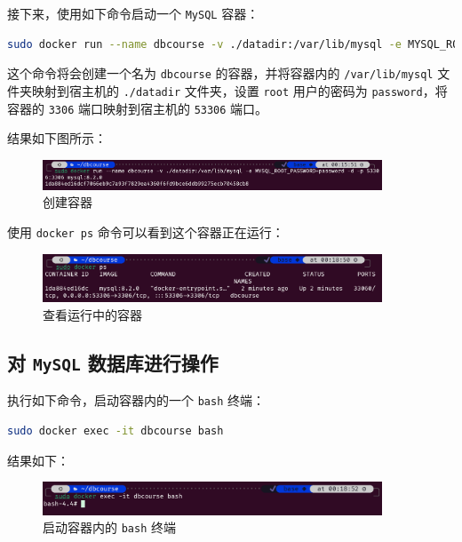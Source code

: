 \documentclass{article}
\begin{document}
接下来，使用如下命令启动一个 \texttt{MySQL} 容器：

\begin{lstlisting}[language=bash]
sudo docker run --name dbcourse -v ./datadir:/var/lib/mysql -e MYSQL_ROOT_PASSWORD=password -d -p 53306:3306 mysql:8.2.0
\end{lstlisting}

这个命令将会创建一个名为 \texttt{dbcourse} 的容器，并将容器内的 \texttt{/var/lib/mysql} 文件夹映射到宿主机的 \texttt{./datadir} 文件夹，设置 \texttt{root} 用户的密码为 \texttt{password}，将容器的 \texttt{3306} 端口映射到宿主机的 \texttt{53306} 端口。

结果如下图所示：

\begin{figure}[H]
  \centering
  \includegraphics[width=0.9\textwidth]{img/3.png}
  \caption{创建容器}
\end{figure}

使用 \texttt{docker ps} 命令可以看到这个容器正在运行：

\begin{figure}[H]
  \centering
  \includegraphics[width=0.9\textwidth]{img/4.png}
  \caption{查看运行中的容器}
\end{figure}

\subsection{对 \texttt{MySQL} 数据库进行操作}

执行如下命令，启动容器内的一个 \texttt{bash} 终端：

\begin{lstlisting}[language=bash]
sudo docker exec -it dbcourse bash
\end{lstlisting}

结果如下：

\begin{figure}[H]
  \centering
  \includegraphics[width=0.9\textwidth]{img/5.png}
  \caption{启动容器内的 \texttt{bash} 终端}
\end{figure}
\end{document}
